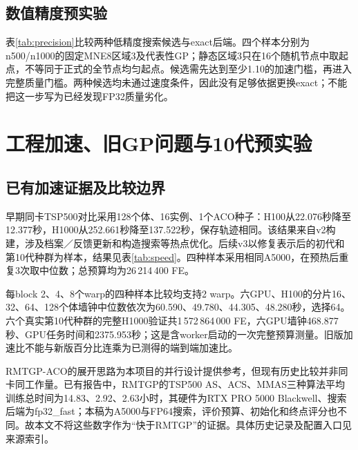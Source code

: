 \documentclass[runningheads,orivec]{llncs}
\begin{document}
\subsection{数值精度预实验}
表\ref{tab:precision}比较两种低精度搜索候选与exact后端。四个样本分别为n500/n1000的固定MNE8区域3及代表性GP；静态区域3只在16个随机节点中取起点，不等同于正式\Ueight{}的全节点均匀起点。候选需先达到至少1.10的加速门槛，再进入完整质量门槛。两种候选均未通过速度条件，因此没有足够依据更换exact；不能把这一步写为已经发现FP32质量劣化。
\begin{table}[htbp]\caption{数值精度预实验的运行时间比较，加速比为exact耗时／候选耗时。}\label{tab:precision}
\centering\small{}\end{table}

\section{工程加速、旧GP问题与10代预实验}
\subsection{已有加速证据及比较边界}
早期同卡TSP500对比采用128个体、16实例、1个ACO种子：H100从22.076秒降至12.377秒，H1000从252.661秒降至137.522秒，保存轨迹相同。该结果来自v2构建，涉及档案／反馈更新和构造搜索等热点优化。后续v3以修复表示后的初代和第10代种群为样本，结果见表\ref{tab:speed}。四种样本采用相同A5000，在预热后重复3次取中位数；总预算均为26\,214\,400 FE。
\begin{table}[htbp]\caption{最新v3同卡布局优化。g10为10代预实验末代样本，不是50代末代种群。}\label{tab:speed}
\centering\small{}\end{table}
每block 2、4、8个warp的四种样本比较均支持2 warp。六GPU、H100的分片16、32、64、128个体墙钟中位数依次为60.590、49.780、44.305、48.280秒，选择64。六个真实第10代种群的完整H1000验证共1\,572\,864\,000 FE，六GPU墙钟468.877秒、GPU任务时间和2375.953秒；这是含worker启动的一次完整预算测量。旧版加速比不能与新版百分比连乘为已测得的端到端加速比。

RMTGP-ACO的展开思路为本项目的并行设计提供参考，但现有历史比较并非同卡同工作量。已有报告中，RMTGP的TSP500 AS、ACS、MMAS三种算法平均训练总时间为14.83、2.92、2.63小时，其硬件为RTX PRO 5000 Blackwell、搜索后端为fp32\_fast；本稿为A5000与FP64搜索，评价预算、初始化和终点评分也不同。故本文不将这些数字作为“快于RMTGP”的证据。具体历史记录及配置入口见来源索引。
\end{document}
